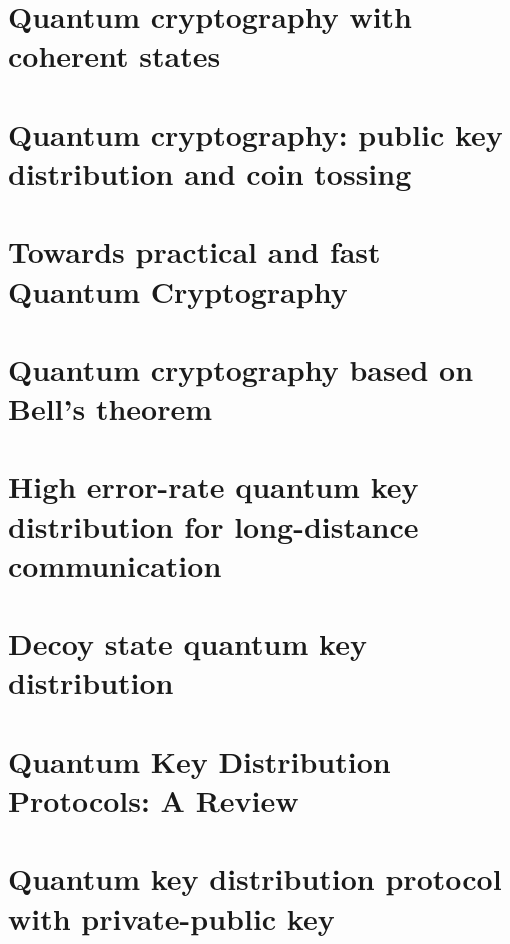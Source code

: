 

\newcommand{\trnas}{Translation}
\newcommand{\dic}{Dictionary}
\newcommand{\review}{Review}




\tableofcontents
\clearpage
\section{Quantum cryptography with coherent states}

%
\section{Quantum cryptography: public key distribution and coin tossing}



\section{Towards practical and fast Quantum Cryptography}



\section{Quantum cryptography based on Bell's theorem}


\section{High error-rate quantum key distribution for long-distance communication }



\section{Decoy state quantum key distribution}




\section{Quantum Key Distribution Protocols: A Review}



\section{Quantum key distribution protocol with private-public key}


